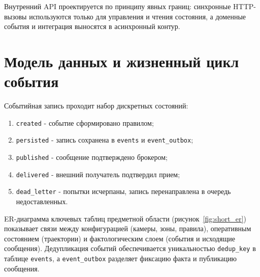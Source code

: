 Внутренний API проектируется по принципу явных границ: синхронные HTTP-вызовы используются только для управления и чтения состояния, а доменные события и интеграция выносятся в асинхронный контур.

\section{Модель данных и жизненный цикл события}

Событийная запись проходит набор дискретных состояний:
\begin{enumerate}
    \item \texttt{created} - событие сформировано правилом;
    \item \texttt{persisted} - запись сохранена в \texttt{events} и \texttt{event\_outbox};
    \item \texttt{published} - сообщение подтверждено брокером;
    \item \texttt{delivered} - внешний получатель подтвердил прием;
    \item \texttt{dead\_letter} - попытки исчерпаны, запись перенаправлена в очередь недоставленных.
\end{enumerate}

ER-диаграмма ключевых таблиц предметной области (рисунок~\ref{fig:short_er}) показывает связи между конфигурацией (камеры, зоны, правила), оперативным состоянием (траектории) и фактологическим слоем (события и исходящие сообщения). Дедупликация событий обеспечивается уникальностью \texttt{dedup\_key} в таблице \texttt{events}, а \texttt{event\_outbox} разделяет фиксацию факта и публикацию сообщения.

